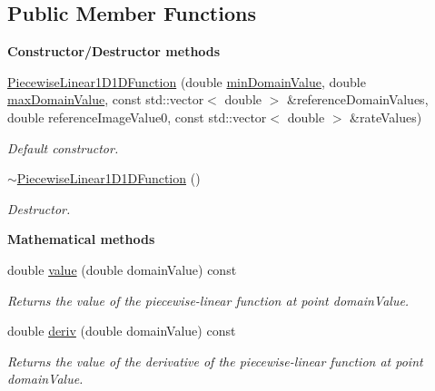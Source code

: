 \subsection*{Public Member Functions}
\begin{Indent}{\bf Constructor/\-Destructor methods}\par
\begin{DoxyCompactItemize}
\item 
\hyperlink{class_q_u_e_s_o_1_1_piecewise_linear1_d1_d_function_a046790d2c900c1fe0e1eee6a67a1d71c}{Piecewise\-Linear1\-D1\-D\-Function} (double \hyperlink{class_q_u_e_s_o_1_1_base1_d1_d_function_a4c110e621ef1ac557bbcc60d41f5a3c2}{min\-Domain\-Value}, double \hyperlink{class_q_u_e_s_o_1_1_base1_d1_d_function_ad2b80d0c52c0cb56c89f70f30b3bb19e}{max\-Domain\-Value}, const std\-::vector$<$ double $>$ \&reference\-Domain\-Values, double reference\-Image\-Value0, const std\-::vector$<$ double $>$ \&rate\-Values)
\begin{DoxyCompactList}\small\item\em Default constructor. \end{DoxyCompactList}\item 
\hyperlink{class_q_u_e_s_o_1_1_piecewise_linear1_d1_d_function_a097219493971b9013a427d2ce8776961}{$\sim$\-Piecewise\-Linear1\-D1\-D\-Function} ()
\begin{DoxyCompactList}\small\item\em Destructor. \end{DoxyCompactList}\end{DoxyCompactItemize}
\end{Indent}
\begin{Indent}{\bf Mathematical methods}\par
\begin{DoxyCompactItemize}
\item 
double \hyperlink{class_q_u_e_s_o_1_1_piecewise_linear1_d1_d_function_a977ad3478bf488b1e3d472f31c3fe146}{value} (double domain\-Value) const 
\begin{DoxyCompactList}\small\item\em Returns the value of the piecewise-\/linear function at point {\ttfamily domain\-Value}. \end{DoxyCompactList}\item 
double \hyperlink{class_q_u_e_s_o_1_1_piecewise_linear1_d1_d_function_aa83d79e691a7cf47dc860e20c75a0cd0}{deriv} (double domain\-Value) const 
\begin{DoxyCompactList}\small\item\em Returns the value of the derivative of the piecewise-\/linear function at point {\ttfamily domain\-Value}. \end{DoxyCompactList}\end{DoxyCompactItemize}
\end{Indent}
